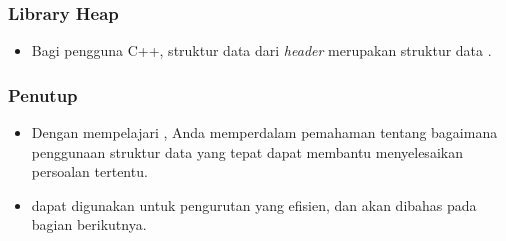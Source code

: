 \begin{frame}
\frametitle{Library Heap}
\begin{itemize}
  \item Bagi pengguna C++, struktur data  dari \textit{header}  merupakan struktur data \pheap.
\end{itemize}
\end{frame}

\begin{frame}
\frametitle{Penutup}
\begin{itemize}
  \item Dengan mempelajari \pheap, Anda memperdalam pemahaman tentang bagaimana penggunaan struktur data yang tepat dapat membantu menyelesaikan persoalan tertentu.
  \item \pHeap dapat digunakan untuk pengurutan yang efisien, dan akan dibahas pada bagian berikutnya.
\end{itemize}
\end{frame}





